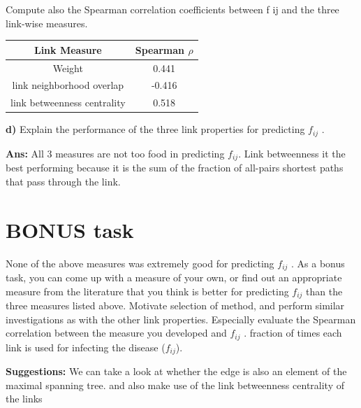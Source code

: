 \documentclass[a4paper,12pt]{article}
\begin{document}
Compute also the Spearman correlation coefficients between f ij and the three link-wise
measures.

\begin{table}[h]
  \begin{tabular}{|c|c|}
    \hline
    Link Measure & Spearman  $\rho$ \\ \hline \hline
    Weight & 0.441 \\ \hline
    link neighborhood overlap & -0.416 \\ \hline
   link betweenness centrality &0.518  \\ \hline
 \end{tabular}
\end{table}

\textbf{d)}  Explain the performance of the three link properties for predicting $f_{ij}$ .

\textbf{Ans: }All 3 measures are not too food in predicting $f_{ij}$. Link betweenness
it the best performing because
it is the sum of the fraction of all-pairs shortest paths that pass through the link.

\section{BONUS task}

None of the above measures was extremely good for predicting $f_{ij}$ . As a bonus task, you can
come up with a measure of your own, or find out an appropriate measure from the literature that
you think is better for predicting $f_{ij}$ than the three measures listed above. Motivate selection of method, and perform similar investigations as with the other link properties. Especially evaluate the Spearman correlation between the measure you developed and $f_{ij}$ . fraction of times each link is used for infecting the disease ($f_{ij}$).

\bigskip
\textbf{Suggestions: } We can take a look at whether the edge is also an element of
the maximal spanning tree. and also make use of the link betweenness centrality of
the links
\end{document}
